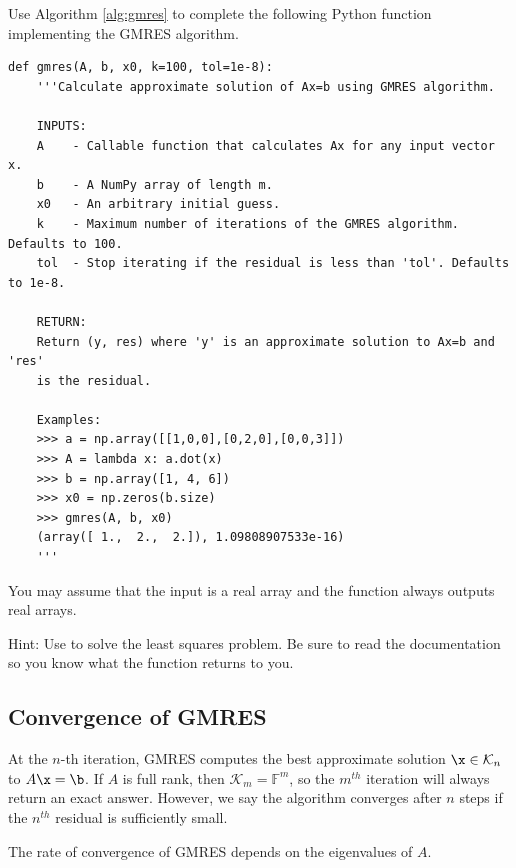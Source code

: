 \begin{problem}
Use Algorithm \ref{alg:gmres} to complete the following Python function implementing the GMRES algorithm.
\begin{lstlisting}
def gmres(A, b, x0, k=100, tol=1e-8):
    '''Calculate approximate solution of Ax=b using GMRES algorithm.

    INPUTS:
    A    - Callable function that calculates Ax for any input vector x.
    b    - A NumPy array of length m.
    x0   - An arbitrary initial guess.
    k    - Maximum number of iterations of the GMRES algorithm. Defaults to 100.
    tol  - Stop iterating if the residual is less than 'tol'. Defaults to 1e-8.

    RETURN:
    Return (y, res) where 'y' is an approximate solution to Ax=b and 'res'
    is the residual.

    Examples:
    >>> a = np.array([[1,0,0],[0,2,0],[0,0,3]])
    >>> A = lambda x: a.dot(x)
    >>> b = np.array([1, 4, 6])
    >>> x0 = np.zeros(b.size)
    >>> gmres(A, b, x0)
    (array([ 1.,  2.,  2.]), 1.09808907533e-16)
    '''
\end{lstlisting}
You may assume that the input  is a real array and the function  always outputs real arrays.

Hint: Use  to solve the least squares problem.  Be sure to read the documentation so you know what the function returns to you.
\label{prob:MyGMRES}
\end{problem}

\subsection*{Convergence of GMRES} %

At the $n$-th iteration, GMRES computes the best approximate solution $\x \in \mathcal{K}_n$ to $A\x = \b$.
If $A$ is full rank, then $\mathcal{K}_m = \mathbb{F}^m$, so the $m^{th}$ iteration will always return an exact answer.
However, we say the algorithm converges after $n$ steps if the $n^{th}$ residual is sufficiently small.

The rate of convergence of GMRES depends on the eigenvalues of $A$.

